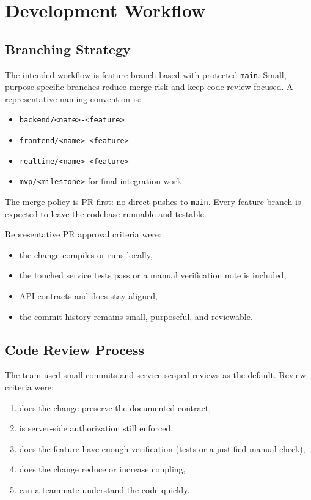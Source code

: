 \section{Development Workflow}

\subsection{Branching Strategy}

The intended workflow is feature-branch based with protected \texttt{main}. Small, purpose-specific
branches reduce merge risk and keep code review focused. A representative naming convention is:

\begin{itemize}
  \item \texttt{backend/<name>-<feature>}
  \item \texttt{frontend/<name>-<feature>}
  \item \texttt{realtime/<name>-<feature>}
  \item \texttt{mvp/<milestone>} for final integration work
\end{itemize}

The merge policy is PR-first: no direct pushes to \texttt{main}. Every feature branch is expected to leave
the codebase runnable and testable.

Representative PR approval criteria were:

\begin{itemize}
  \item the change compiles or runs locally,
  \item the touched service tests pass or a manual verification note is included,
  \item API contracts and docs stay aligned,
  \item the commit history remains small, purposeful, and reviewable.
\end{itemize}

\subsection{Code Review Process}

The team used small commits and service-scoped reviews as the default. Review criteria were:

\begin{enumerate}
  \item does the change preserve the documented contract,
  \item is server-side authorization still enforced,
  \item does the feature have enough verification (tests or a justified manual check),
  \item does the change reduce or increase coupling,
  \item can a teammate understand the code quickly.
\end{enumerate}

